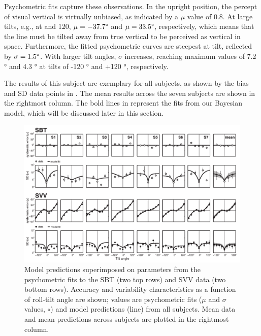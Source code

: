 Psychometric fits capture these observations. In the upright position, the percept of visual vertical is virtually unbiased, as indicated by a $\mu$ value of 0.8\textdegree. At large tilts, e.g., at  and 120\textdegree, $\mu = -37.7\degree$ and $\mu = 33.5\degree$, respectively, which means that the line must be tilted away from true vertical to be perceived as vertical in space. Furthermore, the fitted psychometric curves are steepest at  tilt, reflected by $\sigma = 1.5\degree$. With larger tilt angles, $\sigma$ increases, reaching maximum values of 7.2 \si{\degree} and 4.3 \si{\degree} at tilts of -120 \si{\degree} and +120 \si{\degree}, respectively. 

The results of this subject are exemplary for all subjects, as shown by the bias and SD data points in . The mean results across the seven subjects are shown in the rightmost column. The bold lines in  represent the fits from our Bayesian model, which will be discussed later in this section. 

\begin{figure}
	\includegraphics[width=1.0\textwidth]{src/paper1/figure4.pdf}
	
    \caption{Model predictions superimposed on parameters from the psychometric fits to the SBT (two top rows) and SVV data (two bottom rows). Accuracy and variability characteristics as a function of roll-tilt angle are shown; values are psychometric fits ($\mu$ and $\sigma$ values, $\circ$) and model predictions (line) from all subjects. Mean data and mean predictions across subjects are plotted in the rightmost column.}
    \label{p1:fig4}
\end{figure}


